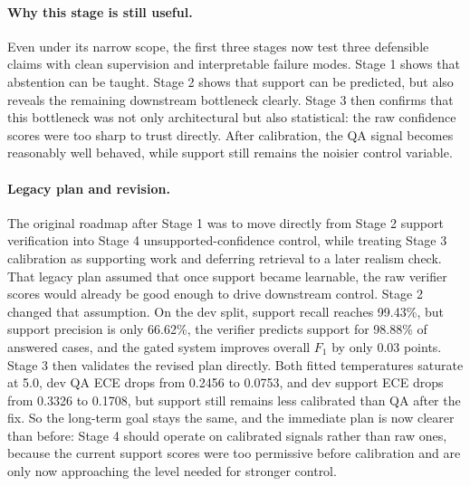 \paragraph{Why this stage is still useful.}
Even under its narrow scope, the first three stages now test three defensible
claims with clean supervision and interpretable failure modes.
Stage 1 shows that abstention can be taught.
Stage 2 shows that support can be predicted, but also reveals the remaining
downstream bottleneck clearly.
Stage 3 then confirms that this bottleneck was not only architectural but also
statistical:
the raw confidence scores were too sharp to trust directly.
After calibration, the QA signal becomes reasonably well behaved, while support
still remains the noisier control variable.

\paragraph{Legacy plan and revision.}
The original roadmap after Stage 1 was to move directly from Stage 2 support
verification into Stage 4 unsupported-confidence control, while treating
Stage 3 calibration as supporting work and deferring retrieval to a later
realism check.
That legacy plan assumed that once support became learnable, the raw verifier
scores would already be good enough to drive downstream control.
Stage 2 changed that assumption.
On the dev split, support recall reaches 99.43\%, but support precision is only
66.62\%, the verifier predicts support for 98.88\% of answered cases, and the
gated system improves overall \(F_1\) by only 0.03 points.
Stage 3 then validates the revised plan directly.
Both fitted temperatures saturate at 5.0, dev QA ECE drops from 0.2456 to
0.0753, and dev support ECE drops from 0.3326 to 0.1708, but support still
remains less calibrated than QA after the fix.
So the long-term goal stays the same, and the immediate plan is now clearer
than before:
Stage 4 should operate on calibrated signals rather than raw ones, because the
current support scores were too permissive before calibration and are only now
approaching the level needed for stronger control.

